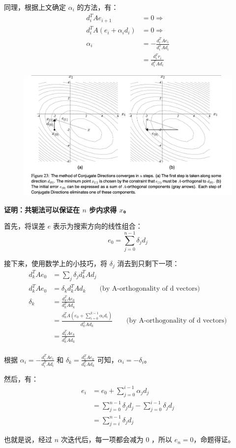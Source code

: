 \documentclass[12pt]{article}
\begin{document}
同理，根据上文确定 $\alpha_i$ 的方法，有：
\begin{align*}
d^T_iAe_{i+1} &= 0 \Rightarrow \\
d^T_iA(e_i + \alpha_id_i) &= 0 \Rightarrow \\
\alpha_i &= -\frac{d^T_iAe_i}{d^T_iAd_i} \\
	&= \frac{d^T_ir_i}{d^T_iAd_i}
\end{align*}
\begin{figure}[H]
    \centering
    \includegraphics[width=1\textwidth]{fig/CG_Convergence_CD_3.png}
\end{figure}

\begin{framed}
\textbf{证明：共轭法可以保证在 $n$ 步内求得 $x$。}

首先，将误差 $e$ 表示为搜索方向的线性组合：
$$
e_0 = \sum_{j=0}^{n-1}\delta_jd_j
$$

接下来，使用数学上的小技巧，将 $\delta_j$ 消去到只剩下一项：
\begin{align*}
d^T_kAe_0 &= \sum_j\delta_jd^T_kAd_j \\
d^T_kAe_0 &= \delta_kd^T_kAd_k \qquad \text{(by A-orthogonality of d vectors)} \\
\delta_k &= \frac{d^T_kAe_0}{d^T_kAd_k} \\
	&= \frac{d^T_kA(e_0 + \sum_{i=0}^{k-1}\alpha_id_i)}{d^T_kAd_k} \qquad \text{(by A-orthogonality of d vectors)} \\
	&= \frac{d^T_kAe_k}{d^T_kAd_k} \\
\end{align*}

根据 $\alpha_i = -\frac{d^T_iAe_i}{d^T_iAd_i}$ 和 $\delta_k = \frac{d^T_kAe_k}{d^T_kAd_k}$ 可知，$\alpha_i = -\delta_i$。

然后，有：
\begin{align*}
e_i &= e_0 + \sum_{j=0}^{i-1}\alpha_jd_j \\
	&= \sum_{j=0}^{n-1}\delta_jd_j - \sum_{j=0}^{i-1}\delta_jd_j \\
	&= \sum_{j=i}^{n-1}\delta_jd_j
\end{align*}

也就是说，经过 $n$ 次迭代后，每一项都会减为 0 ，所以 $e_n = 0$，命题得证。
\end{framed}
\end{document}
